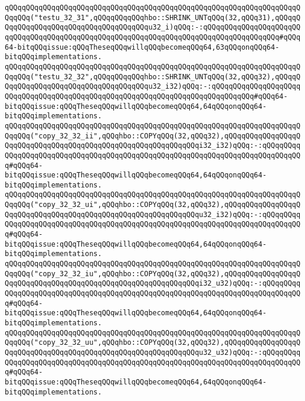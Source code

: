 \verb|qQQqqQQqqQQqqQQqqQQqqQQqqQQqqQQqqQQqqQQqqQQqqQQqqQQqqQQqqQQqqQQqqQQqqQQqqQQq("testu_32_31",qQQqqQQqqQQqhbo::SHRINK_UNTqQQq(32,qQQq31),qQQqqQQqqQQqqQQqqQQqqQQqqQQqqQQqqQQqqQQqu32_i)qQQq:-:qQQqqQQqqQQqqQQqqQQqqQQqqQQqqQQqqQQqqQQqqQQqqQQqqQQqqQQqqQQqqQQqqQQqqQQqqQQqqQQqqQQqqQQq#qQQq64-bitqQQqissue:qQQqTheseqQQqwillqQQqbecomeqQQq64,63qQQqonqQQq64-bitqQQqimplementations.|\newline
\newline
\verb|qQQqqQQqqQQqqQQqqQQqqQQqqQQqqQQqqQQqqQQqqQQqqQQqqQQqqQQqqQQqqQQqqQQqqQQqqQQq("testu_32_32",qQQqqQQqqQQqhbo::SHRINK_UNTqQQq(32,qQQq32),qQQqqQQqqQQqqQQqqQQqqQQqqQQqqQQqqQQqqQQqu32_i32)qQQq:-:qQQqqQQqqQQqqQQqqQQqqQQqqQQqqQQqqQQqqQQqqQQqqQQqqQQqqQQqqQQqqQQqqQQqqQQqqQQqqQQq#qQQq64-bitqQQqissue:qQQqTheseqQQqwillqQQqbecomeqQQq64,64qQQqonqQQq64-bitqQQqimplementations.|\newline
\newline
\verb|qQQqqQQqqQQqqQQqqQQqqQQqqQQqqQQqqQQqqQQqqQQqqQQqqQQqqQQqqQQqqQQqqQQqqQQqqQQq("copy_32_32_ii",qQQqhbo::COPYqQQq(32,qQQq32),qQQqqQQqqQQqqQQqqQQqqQQqqQQqqQQqqQQqqQQqqQQqqQQqqQQqqQQqqQQqqQQqi32_i32)qQQq:-:qQQqqQQqqQQqqQQqqQQqqQQqqQQqqQQqqQQqqQQqqQQqqQQqqQQqqQQqqQQqqQQqqQQqqQQqqQQqqQQq#qQQq64-bitqQQqissue:qQQqTheseqQQqwillqQQqbecomeqQQq64,64qQQqonqQQq64-bitqQQqimplementations.|\newline
\verb|qQQqqQQqqQQqqQQqqQQqqQQqqQQqqQQqqQQqqQQqqQQqqQQqqQQqqQQqqQQqqQQqqQQqqQQqqQQq("copy_32_32_ui",qQQqhbo::COPYqQQq(32,qQQq32),qQQqqQQqqQQqqQQqqQQqqQQqqQQqqQQqqQQqqQQqqQQqqQQqqQQqqQQqqQQqqQQqu32_i32)qQQq:-:qQQqqQQqqQQqqQQqqQQqqQQqqQQqqQQqqQQqqQQqqQQqqQQqqQQqqQQqqQQqqQQqqQQqqQQqqQQqqQQq#qQQq64-bitqQQqissue:qQQqTheseqQQqwillqQQqbecomeqQQq64,64qQQqonqQQq64-bitqQQqimplementations.|\newline
\verb|qQQqqQQqqQQqqQQqqQQqqQQqqQQqqQQqqQQqqQQqqQQqqQQqqQQqqQQqqQQqqQQqqQQqqQQqqQQq("copy_32_32_iu",qQQqhbo::COPYqQQq(32,qQQq32),qQQqqQQqqQQqqQQqqQQqqQQqqQQqqQQqqQQqqQQqqQQqqQQqqQQqqQQqqQQqqQQqi32_u32)qQQq:-:qQQqqQQqqQQqqQQqqQQqqQQqqQQqqQQqqQQqqQQqqQQqqQQqqQQqqQQqqQQqqQQqqQQqqQQqqQQqqQQq#qQQq64-bitqQQqissue:qQQqTheseqQQqwillqQQqbecomeqQQq64,64qQQqonqQQq64-bitqQQqimplementations.|\newline
\verb|qQQqqQQqqQQqqQQqqQQqqQQqqQQqqQQqqQQqqQQqqQQqqQQqqQQqqQQqqQQqqQQqqQQqqQQqqQQq("copy_32_32_uu",qQQqhbo::COPYqQQq(32,qQQq32),qQQqqQQqqQQqqQQqqQQqqQQqqQQqqQQqqQQqqQQqqQQqqQQqqQQqqQQqqQQqqQQqu32_u32)qQQq:-:qQQqqQQqqQQqqQQqqQQqqQQqqQQqqQQqqQQqqQQqqQQqqQQqqQQqqQQqqQQqqQQqqQQqqQQqqQQqqQQq#qQQq64-bitqQQqissue:qQQqTheseqQQqwillqQQqbecomeqQQq64,64qQQqonqQQq64-bitqQQqimplementations.|\newline
